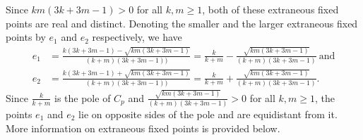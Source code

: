 \documentclass[12pt]{article}
\begin{document}
Since $km\left(3k+3m-1\right) > 0$ for all $k,m \geq 1$, both of these extraneous fixed points are real and distinct. Denoting the smaller and the larger extraneous fixed points by $e_1$ and $e_2$  respectively, we have\\
$$
\begin{aligned}
	e_1&=\frac{k\left(3k+3m-1\right)- \sqrt{km\left(3k+3m-1\right)}}{(k+m)\left(3k+3m-1\right))}=\frac{k}{k+m}-\frac{\sqrt{km\left(3k+3m-1\right)}}{(k+m)\left(3k+3m-1\right)}~\mbox{and}\\
	e_2&=\frac{k\left(3k+3m-1\right)+ \sqrt{km\left(3k+3m-1\right)}}{(k+m)\left(3k+3m-1\right))}=\frac{k}{k+m}+\frac{\sqrt{km\left(3k+3m-1\right)}}{(k+m)\left(3k+3m-1\right)}.
\end{aligned}
$$
Since $\frac{k}{k+m}$ is the pole of $C_p$ and $\frac{\sqrt{km\left(3k+3m-1\right)}}{(k+m)\left(3k+3m-1\right)}>0$ for all $k,m \geq 1$, the points $e_1$ and $e_2$ lie on opposite sides of the pole and are equidistant from it. More information on extraneous fixed points is provided below.
 
\end{document}
